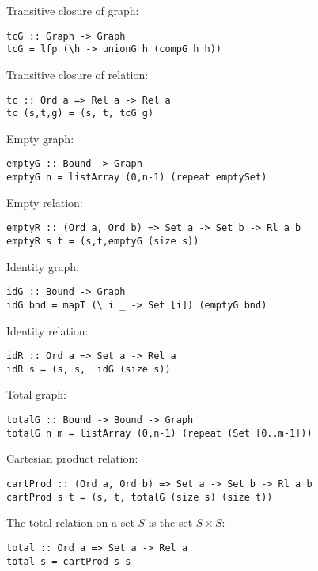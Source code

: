Transitive closure of graph: 

\bc\begin{verbatim}
tcG :: Graph -> Graph
tcG = lfp (\h -> unionG h (compG h h))
\end{verbatim}\ec

Transitive closure of relation: 

\bc\begin{verbatim}
tc :: Ord a => Rel a -> Rel a
tc (s,t,g) = (s, t, tcG g)
\end{verbatim}\ec

Empty graph: 

\bc\begin{verbatim}
emptyG :: Bound -> Graph
emptyG n = listArray (0,n-1) (repeat emptySet)
\end{verbatim}\ec

Empty relation: 

\bc\begin{verbatim}
emptyR :: (Ord a, Ord b) => Set a -> Set b -> Rl a b
emptyR s t = (s,t,emptyG (size s))
\end{verbatim}\ec

Identity graph: 

\bc\begin{verbatim}
idG :: Bound -> Graph 
idG bnd = mapT (\ i _ -> Set [i]) (emptyG bnd)
\end{verbatim}\ec

Identity relation: 

\bc\begin{verbatim}
idR :: Ord a => Set a -> Rel a 
idR s = (s, s,  idG (size s))
\end{verbatim}\ec

Total graph: 

\bc\begin{verbatim}
totalG :: Bound -> Bound -> Graph
totalG n m = listArray (0,n-1) (repeat (Set [0..m-1]))
\end{verbatim}\ec

Cartesian product relation: 

\bc\begin{verbatim}
cartProd :: (Ord a, Ord b) => Set a -> Set b -> Rl a b 
cartProd s t = (s, t, totalG (size s) (size t)) 
\end{verbatim}\ec

The total relation on a set $S$ is the set $S \times S$: 

\bc\begin{verbatim}
total :: Ord a => Set a -> Rel a
total s = cartProd s s 
\end{verbatim}\ec 

